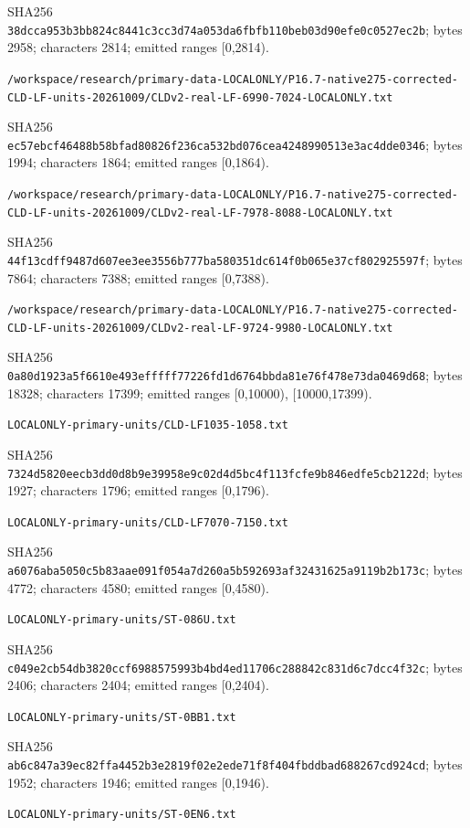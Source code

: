 \documentclass[11pt]{article}
\begin{document}
SHA256 \texttt{38dcca953b3bb824c8441c3cc3d74a053da6fbfb110beb03d90efe0c0527ec2b}; bytes 2958; characters 2814; emitted ranges [0,2814).

\texttt{/\allowbreak workspace/\allowbreak research/\allowbreak primary-data-LOCALONLY/\allowbreak P16.7-native275-corrected-CLD-LF-units-20261009/\allowbreak CLDv2-real-LF-6990-7024-LOCALONLY.txt}

SHA256 \texttt{ec57ebcf46488b58bfad80826f236ca532bd076cea4248990513e3ac4dde0346}; bytes 1994; characters 1864; emitted ranges [0,1864).

\texttt{/\allowbreak workspace/\allowbreak research/\allowbreak primary-data-LOCALONLY/\allowbreak P16.7-native275-corrected-CLD-LF-units-20261009/\allowbreak CLDv2-real-LF-7978-8088-LOCALONLY.txt}

SHA256 \texttt{44f13cdff9487d607ee3ee3556b777ba580351dc614f0b065e37cf802925597f}; bytes 7864; characters 7388; emitted ranges [0,7388).

\texttt{/\allowbreak workspace/\allowbreak research/\allowbreak primary-data-LOCALONLY/\allowbreak P16.7-native275-corrected-CLD-LF-units-20261009/\allowbreak CLDv2-real-LF-9724-9980-LOCALONLY.txt}

SHA256 \texttt{0a80d1923a5f6610e493efffff77226fd1d6764bbda81e76f478e73da0469d68}; bytes 18328; characters 17399; emitted ranges [0,10000), [10000,17399).

\texttt{LOCALONLY-primary-units/\allowbreak CLD-LF1035-1058.txt}

SHA256 \texttt{7324d5820eecb3dd0d8b9e39958e9c02d4d5bc4f113fcfe9b846edfe5cb2122d}; bytes 1927; characters 1796; emitted ranges [0,1796).

\texttt{LOCALONLY-primary-units/\allowbreak CLD-LF7070-7150.txt}

SHA256 \texttt{a6076aba5050c5b83aae091f054a7d260a5b592693af32431625a9119b2b173c}; bytes 4772; characters 4580; emitted ranges [0,4580).

\texttt{LOCALONLY-primary-units/\allowbreak ST-086U.txt}

SHA256 \texttt{c049e2cb54db3820ccf6988575993b4bd4ed11706c288842c831d6c7dcc4f32c}; bytes 2406; characters 2404; emitted ranges [0,2404).

\texttt{LOCALONLY-primary-units/\allowbreak ST-0BB1.txt}

SHA256 \texttt{ab6c847a39ec82ffa4452b3e2819f02e2ede71f8f404fbddbad688267cd924cd}; bytes 1952; characters 1946; emitted ranges [0,1946).

\texttt{LOCALONLY-primary-units/\allowbreak ST-0EN6.txt}
\end{document}
